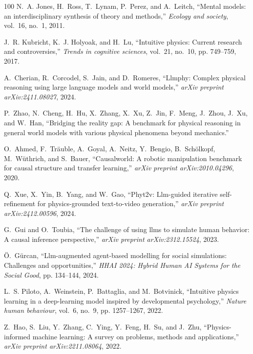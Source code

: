 \documentclass[10pt,journal,compsoc]{IEEEtran}
\begin{document}
\begin{thebibliography}{100}
	N.~A. Jones, H.~Ross, T.~Lynam, P.~Perez, and A.~Leitch, ``Mental models: an
	interdisciplinary synthesis of theory and methods,'' \emph{Ecology and
		society}, vol.~16, no.~1, 2011.
	
	J.~R. Kubricht, K.~J. Holyoak, and H.~Lu, ``Intuitive physics: Current research
	and controversies,'' \emph{Trends in cognitive sciences}, vol.~21, no.~10,
	pp. 749--759, 2017.
	
	A.~Cherian, R.~Corcodel, S.~Jain, and D.~Romeres, ``Llmphy: Complex physical
	reasoning using large language models and world models,'' \emph{arXiv
		preprint arXiv:2411.08027}, 2024.
	
	P.~Zhao, N.~Cheng, H.~Hu, X.~Zhang, X.~Xu, Z.~Jin, F.~Meng, J.~Zhou, J.~Xu, and
	W.~Han, ``Bridging the reality gap: A benchmark for physical reasoning in
	general world models with various physical phenomena beyond mechanics.''
	
	O.~Ahmed, F.~Tr{\"a}uble, A.~Goyal, A.~Neitz, Y.~Bengio, B.~Sch{\"o}lkopf,
	M.~W{\"u}thrich, and S.~Bauer, ``Causalworld: A robotic manipulation
	benchmark for causal structure and transfer learning,'' \emph{arXiv preprint
		arXiv:2010.04296}, 2020.
	
	Q.~Xue, X.~Yin, B.~Yang, and W.~Gao, ``Phyt2v: Llm-guided iterative
	self-refinement for physics-grounded text-to-video generation,'' \emph{arXiv
		preprint arXiv:2412.00596}, 2024.
	
	G.~Gui and O.~Toubia, ``The challenge of using llms to simulate human behavior:
	A causal inference perspective,'' \emph{arXiv preprint arXiv:2312.15524},
	2023.
	
	{\"O}.~G{\"u}rcan, ``Llm-augmented agent-based modelling for social
	simulations: Challenges and opportunities,'' \emph{HHAI 2024: Hybrid Human AI
		Systems for the Social Good}, pp. 134--144, 2024.
	
	L.~S. Piloto, A.~Weinstein, P.~Battaglia, and M.~Botvinick, ``Intuitive physics
	learning in a deep-learning model inspired by developmental psychology,''
	\emph{Nature human behaviour}, vol.~6, no.~9, pp. 1257--1267, 2022.
	
	Z.~Hao, S.~Liu, Y.~Zhang, C.~Ying, Y.~Feng, H.~Su, and J.~Zhu,
	``Physics-informed machine learning: A survey on problems, methods and
	applications,'' \emph{arXiv preprint arXiv:2211.08064}, 2022.
	

\end{thebibliography}
\end{document}
